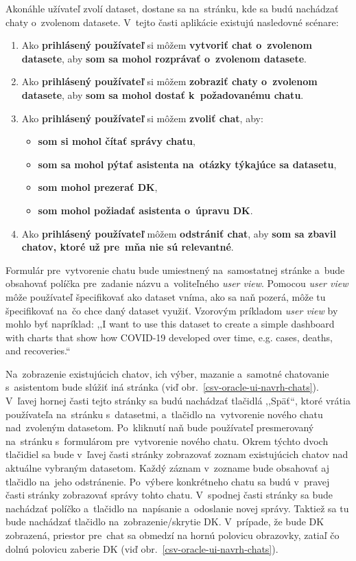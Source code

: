 Akonáhle užívateľ zvolí dataset, dostane sa na~stránku, kde sa budú nachádzať chaty o~zvolenom datasete. V~tejto časti aplikácie existujú nasledovné scénare:

\begin{enumerate}
\item Ako \textbf{prihlásený používateľ} si môžem \textbf{vytvoriť chat o~zvolenom datasete}, aby \textbf{som sa mohol rozprávať o~zvolenom datasete}.
\item Ako \textbf{prihlásený používateľ} si môžem \textbf{zobraziť chaty o~zvolenom datasete}, aby \textbf{som sa mohol dostať k~požadovanému chatu}.
\item Ako \textbf{prihlásený používateľ} si môžem \textbf{zvoliť chat}, aby:
\begin{itemize}
\item \textbf{som si mohol čítať správy chatu},
\item \textbf{som sa mohol pýtať asistenta na~otázky týkajúce sa datasetu},
\item \textbf{som mohol prezerať DK},
\item \textbf{som mohol požiadať asistenta o~úpravu DK}.
\end{itemize}
\item Ako \textbf{prihlásený používateľ} môžem \textbf{odstrániť chat}, aby \textbf{som sa zbavil chatov, ktoré už pre~mňa nie sú relevantné}.
\end{enumerate}

Formulár pre~vytvorenie chatu bude umiestnený na~samostatnej stránke a~bude obsahovať políčka pre~zadanie názvu a~voliteľného \textit{user view}. Pomocou \textit{user view} môže používateľ špecifikovať ako dataset vníma, ako sa naň pozerá, môže tu špecifikovať na~čo chce daný dataset využiť. Vzorovým príkladom \textit{user view} by mohlo byť napríklad: ,,I want to use this dataset to create a simple dashboard with charts that show how COVID-19 developed over time, e.g. cases, deaths, and recoveries.``

Na~zobrazenie existujúcich chatov, ich výber, mazanie a~samotné chatovanie s~asistentom bude slúžiť iná stránka (viď obr.~\ref{csv-oracle-ui-navrh-chats}). V~ľavej hornej časti tejto stránky sa budú nachádzať tlačidlá ,,Späť``, ktoré vrátia používateľa na~stránku s~datasetmi, a~tlačidlo na~vytvorenie nového chatu nad~zvoleným datasetom. Po~kliknutí naň bude používateľ presmerovaný na~stránku s~formulárom pre~vytvorenie nového chatu. Okrem týchto dvoch tlačidiel sa bude v~ľavej časti stránky zobrazovať zoznam existujúcich chatov nad aktuálne vybraným datasetom. Každý záznam v~zozname bude obsahovať aj tlačidlo na~jeho odstránenie. Po~výbere konkrétneho chatu sa budú v~pravej časti stránky zobrazovať správy tohto chatu. V~spodnej časti stránky sa bude nachádzať políčko a~tlačidlo na~napísanie a~odoslanie novej správy. Taktiež sa tu bude nachádzať tlačidlo na~zobrazenie/skrytie DK. V~prípade, že bude DK zobrazená, priestor pre~chat sa obmedzí na hornú polovicu obrazovky, zatiaľ čo dolnú polovicu zaberie DK (viď obr.~\ref{csv-oracle-ui-navrh-chats}).

